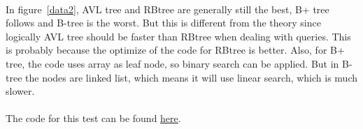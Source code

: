 \documentclass{article}
\begin{document}
\paragraph{}
In figure~\ref{data2}, AVL tree and RBtree are generally still the best, B+ tree follows and B-tree is the worst. But this is different from the theory since logically AVL tree should be faster than RBtree when dealing with queries. This is probably because the optimize of the code for RBtree is better. Also, for B+ tree, the code uses array as leaf node, so binary search can be applied. But in B-tree the nodes are linked list, which means it will use linear search, which is much slower.

\paragraph{}
The code for this test can be found \href{https://github.com/yty-yang/TreeComparison.git}{here}.

\newpage


\nocite{*}

\newpage

\appendix
\end{document}
